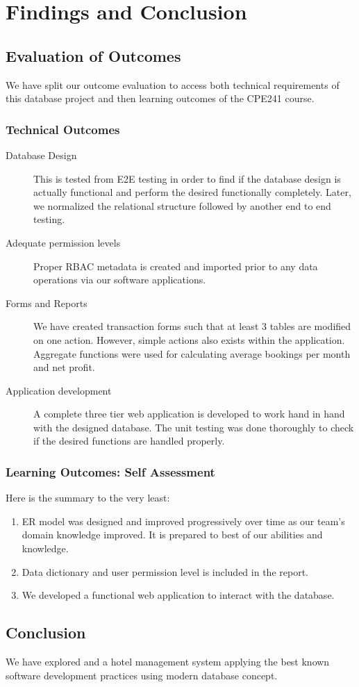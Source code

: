 \chapter{Findings and Conclusion}

\section{Evaluation of Outcomes}

We have split our outcome evaluation to access both technical requirements of this database project and then learning outcomes of the CPE241 course.

\subsection{Technical Outcomes}

\begin{description}
	\item[Database Design] This is tested from E2E testing in order to find if the database design is actually functional and perform the desired functionally completely. Later, we normalized the relational structure followed by another end to end testing.
	\item[Adequate permission levels] Proper RBAC metadata is created and imported prior to any data operations via our software applications.
	\item[Forms and Reports] We have created transaction forms such that at least 3 tables are modified on one action. However, simple actions also exists within the application. Aggregate functions were used for calculating average bookings per month and net profit.
	\item[Application development] A complete three tier web application is developed to work hand in hand with the designed database. The unit testing was done thoroughly to check if the desired functions are handled properly.
\end{description}

\subsection[Learning Outcomes]{Learning Outcomes: Self Assessment}

Here is the summary to the very least:

\begin{enumerate}
	\item ER model was designed and improved progressively over time as our team's domain knowledge improved. It is prepared to best of our abilities and knowledge.
	\item Data dictionary and user permission level is included in the report.
	\item We developed a functional web application to interact with the database.
\end{enumerate}

\section{Conclusion}

We have explored and a hotel management system applying the best known software development practices using modern database concept.

\clearpage
